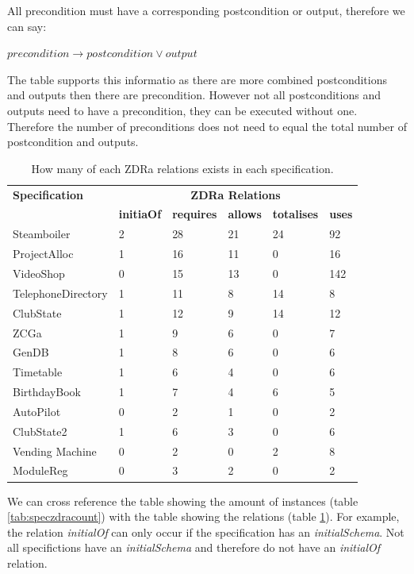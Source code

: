 All precondition must have a corresponding postcondition or output, therefore we can say:

\begin{lemma}
$precondition \longrightarrow postcondition \lor output$
\end{lemma}

The table supports this informatio as there are more combined postconditions and outputs then there are precondition. However not all postconditions and outputs need to have a precondition, they can be executed without one. Therefore the number of preconditions does not need to equal the total number of postcondition and outputs.

\begin{table}[H]
\begin{tabular}{|l |l | l |l | l| l |}
\hline
\textbf{Specification} & \multicolumn{5}{c|}{\textbf{ZDRa Relations}}\\
\cline{2-6}
 & \textbf{initiaOf} & \textbf{requires} & \textbf{allows} & \textbf{totalises} & \textbf{uses} \\
\hline
Steamboiler & 2 & 28 & 21 & 24 & 92  \\
ProjectAlloc & 1 & 16 & 11 & 0 & 16  \\
VideoShop  & 0 & 15 & 13 & 0 & 142  \\
TelephoneDirectory &  1 & 11 & 8 & 14 & 8 \\
ClubState &  1 & 12 & 9 & 14 & 12  \\
ZCGa & 1 & 9 & 6 & 0 & 7  \\
GenDB & 1 & 8 & 6 & 0 & 6  \\
Timetable & 1 & 6 & 4 & 0 & 6  \\
BirthdayBook & 1 & 7 & 4 & 6 & 5  \\
AutoPilot & 0 & 2 & 1 & 0 & 2 \\
ClubState2 & 1 & 6 & 3 & 0 & 6 \\
Vending Machine & 0 & 2 & 0 & 2 & 8  \\
ModuleReg & 0 & 3 & 2 & 0 & 2  \\
\hline
\end{tabular}
\caption{How many of each ZDRa relations exists in each specification. \label{tab:speczdrarelationscount}}
\end{table}

We can cross reference the table showing the amount of instances (table \ref{tab:speczdracount}) with the table showing the relations (table \ref{tab:speczdrarelationscount}). For example, the relation \emph{initialOf} can only occur if the specification has an \emph{initialSchema}. Not all specifictions have an \emph{initialSchema} and therefore do not have an \emph{initialOf} relation.

